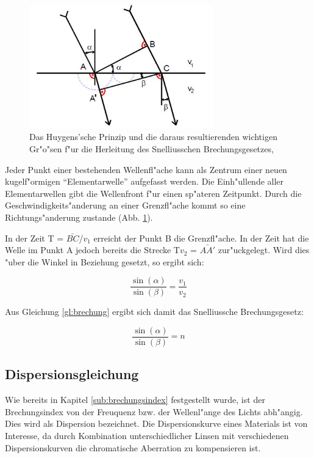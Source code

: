	\begin{figure}[!h]
		\centering
		\includegraphics[width = 8cm]{img/huygen.jpg}
		\caption{Das Huygens'sche Prinzip und die daraus resultierenden wichtigen Gr"o"sen f"ur die Herleitung des Snelliusschen Brechungsgesetzes, \cite{anleitung}}
		\label{huygen}
	\end{figure}

	Jeder Punkt einer bestehenden Wellenfl"ache kann als Zentrum einer neuen kugelf"ormigen "`Elementarwelle"' aufgefasst werden. Die Einh"ullende aller Elementarwellen gibt die Wellenfront f"ur einen sp"ateren Zeitpunkt. Durch die Geschwindigkeits"anderung an einer Grenzfl"ache kommt so eine Richtungs"anderung zustande (Abb. \ref{huygen}).

	In der Zeit T = $\bar{BC}$/$v_\mathrm{1}$ erreicht der Punkt B die Grenzfl"ache. In der Zeit hat die Welle im Punkt A jedoch bereits die Strecke T$v_\mathrm{2}$ =  $\bar{AA'}$ zur"uckgelegt. Wird dies "uber die Winkel in Beziehung gesetzt, so ergibt sich:

	\begin{equation}
		\frac{\sin(\alpha)}{\sin(\beta)} = \frac{v_\mathrm{1}}{v_\mathrm{2}}  \label{gl:huygen}
	\end{equation}

	Aus Gleichung \eqref{gl:brechung} ergibt sich damit das Snelliussche Brechungsgesetz:

	\begin{equation}
		\frac{\sin(\alpha)}{\sin(\beta)} = n  \label{snellius}
	\end{equation}

	\subsection{Dispersionsgleichung} %
	\label{sub:dispersionsgleichung}
	
	Wie bereits in Kapitel \ref{sub:brechungsindex} festgestellt wurde, ist der Brechungsindex von der Freuquenz bzw. der Wellenl"ange des Lichts abh"angig. Dies wird als Dispersion bezeichnet. Die Dispersionskurve eines Materials ist von Interesse, da durch Kombination unterschiedlicher Linsen mit verschiedenen Dispersionskurven die chromatische Aberration zu kompensieren ist.


